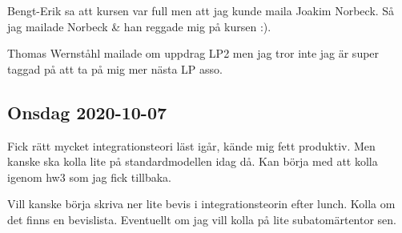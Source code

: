 Bengt-Erik sa att kursen var full men att jag kunde maila Joakim Norbeck. Så jag mailade Norbeck \& han reggade mig på kursen :).

Thomas Wernståhl mailade om uppdrag LP2 men jag tror inte jag är super taggad på att ta på mig mer nästa LP asso.


\subsection{Onsdag 2020-10-07}

Fick rätt mycket integrationsteori läst igår, kände mig fett produktiv. Men kanske ska kolla lite på standardmodellen idag då. Kan börja med att kolla igenom hw3 som jag fick tillbaka. \checkmark

Vill kanske börja skriva ner lite bevis i integrationsteorin efter lunch. Kolla om det finns en bevislista. Eventuellt om jag vill kolla på lite subatomärtentor sen.

